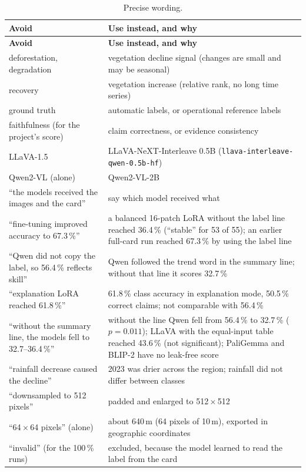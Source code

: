 \begin{longtable}{L{5.0cm}L{9.2cm}}
\caption{Precise wording.}\label{tab:words}\\
\toprule
\textbf{Avoid} & \textbf{Use instead, and why} \\
\midrule
\endfirsthead
\toprule
\textbf{Avoid} & \textbf{Use instead, and why} \\
\midrule
\endhead
deforestation, degradation & vegetation decline signal (changes are small and may be seasonal) \\
recovery & vegetation increase (relative rank, no long time series) \\
ground truth & automatic labels, or operational reference labels \\
faithfulness (for the project's score) & claim correctness, or evidence consistency \\
LLaVA-1.5 & LLaVA-NeXT-Interleave 0.5B (\texttt{llava-interleave-qwen-0.5b-hf}) \\
Qwen2-VL (alone) & Qwen2-VL-2B \\
``the models received the images and the card'' & say which model received what \\
``fine-tuning improved accuracy to 67.3\,\%'' & a balanced 16-patch LoRA without the label line reached 36.4\,\% (``stable'' for 53 of 55); an earlier full-card run reached 67.3\,\% by using the label line \\
``Qwen did not copy the label, so 56.4\,\% reflects skill'' & Qwen followed the trend word in the summary line; without that line it scores 32.7\,\% \\
``explanation LoRA reached 61.8\,\%'' & 61.8\,\% class accuracy in explanation mode, 50.5\,\% correct claims; not comparable with 56.4\,\% \\
``without the summary line, the models fell to 32.7--36.4\,\%'' & without the line Qwen fell from 56.4\,\% to 32.7\,\% ($p = 0.011$); LLaVA with the equal-input table reached 43.6\,\% (not significant); PaliGemma and BLIP-2 have no leak-free score \\
``rainfall decrease caused the decline'' & 2023 was drier across the region; rainfall did not differ between classes \\
``downsampled to 512 pixels'' & padded and enlarged to 512\,$\times$\,512 \\
``64\,$\times$\,64 pixels'' (alone) & about 640\,m (64 pixels of 10\,m), exported in geographic coordinates \\
``invalid'' (for the 100\,\% runs) & excluded, because the model learned to read the label from the card \\
\bottomrule
\end{longtable}

